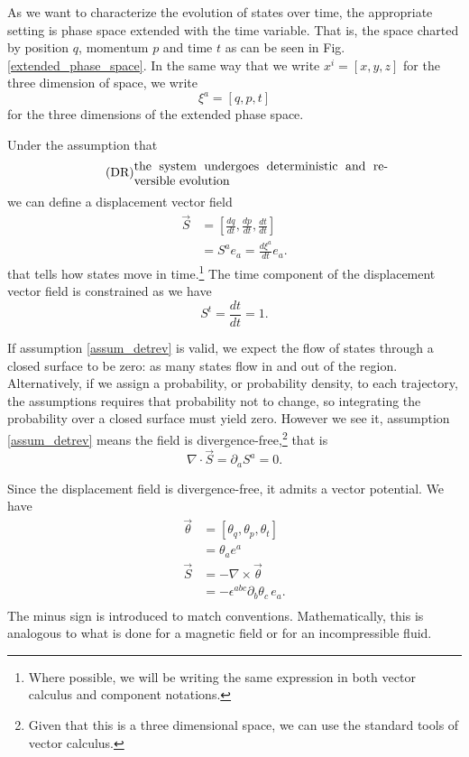 \documentclass[10pt,twocolumn, nofootinbib]{revtex4-2}
\begin{document}
As we want to characterize the evolution of states over time, the appropriate setting is phase space extended with the time variable. That is, the space charted by position $q$, momentum $p$ and time $t$ as can be seen in Fig. \ref{extended_phase_space}. In the same way that we write $x^i = [ x, y, z ]$ for the three dimension of space, we write
\begin{equation}\label{sdof_variables}
	\xi^a = [ q, p, t]
\end{equation}
for the three dimensions of the extended phase space.

Under the assumption that
\begin{align}\label{assum_detrev}
	\tag*{(DR)}
	\parbox{2.8in}{the system undergoes deterministic and reversible evolution}
\end{align}
we can define a displacement vector field
\begin{equation}\label{sdof_displacement}
\begin{aligned}
	\vec{S} &= \left[ \frac{dq}{dt},\frac{dp}{dt},\frac{dt}{dt} \right] \\
	&= S^a e_a = \frac{d\xi^a}{dt} e_a .
\end{aligned}
\end{equation}
that tells how states move in time.\footnote{Where possible, we will be writing the same expression in both vector calculus and component notations.} The time component of the displacement vector field is constrained as we have
\begin{equation}\label{sdof_time_constraint}
	S^t=\frac{dt}{dt}=1.
\end{equation}

If assumption \ref{assum_detrev} is valid, we expect the flow of states through a closed surface to be zero: as many states flow in and out of the region. Alternatively, if we assign a probability, or probability density, to each trajectory, the assumptions requires that probability not to change, so integrating the probability over a closed surface must yield zero. However we see it, assumption \ref{assum_detrev} means the field is divergence-free,\footnote{Given that this is a three dimensional space, we can use the standard tools of vector calculus.} that is
\begin{equation}\label{sdof_div_free}
	\nabla \cdot \vec{S} = \partial_a S^a = 0.
\end{equation}

Since the displacement field is divergence-free, it admits a vector potential. We have
\begin{equation}\label{sdof_displacement_potential}
\begin{aligned}
	\vec{\theta} &= [\theta_q, \theta_p, \theta_t] \\
	&= \theta_a e^a \\
	\vec{S} &= - \nabla \times \vec{\theta} \\
	&= - \epsilon^{abc} \partial_b \theta_c \, e_a. \\
\end{aligned}
\end{equation}
The minus sign is introduced to match conventions. Mathematically, this is analogous to what is done for a magnetic field or for an incompressible fluid.
\end{document}
